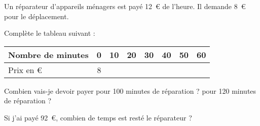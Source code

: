Un réparateur d'appareils ménagers est payé 12~\textgreek{\euro} de l'heure. Il demande 8~\textgreek{\euro} pour le déplacement.
\begin{myenumerate}
\item Complète le tableau suivant :
\begin{center}
  \begin{tabularx}{15cm}{|X|c|c|c|c|c|c|c|}
\hline
Nombre de minutes&0&10&20&30&40&50&60\\
\hline
Prix en \textgreek{\euro}&8&&&&&&\\
\hline    
  \end{tabularx}
\end{center}
\item Combien vais-je devoir payer pour 100 minutes de réparation ? pour 120 minutes de réparation ?
\item Si j'ai payé 92~\textgreek{\euro}, combien de temps est resté le réparateur ?
\end{myenumerate}
